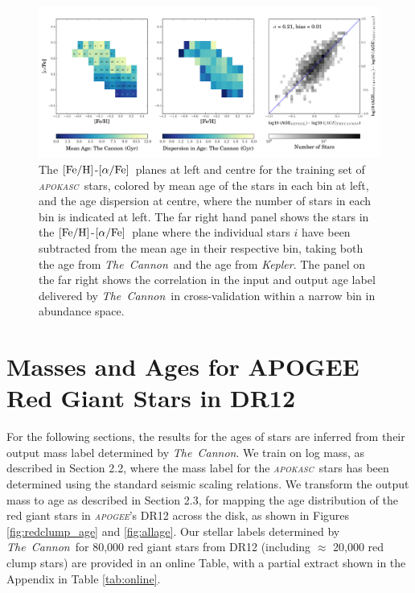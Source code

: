 \documentclass[12pt, preprint]{aastex}
\newcommand{\project}[1]{\textsl{#1}}
\newcommand{\tc}{\project{The~Cannon}}
\newcommand{\apogee}{\project{\textsc{apogee}}}
\newcommand{\apokasc}{\project{\textsc{apokasc}}}
\newcommand{\kepler}{\project{Kepler}}
\newcommand{\feh}{\mbox{$\rm [Fe/H]$}}
\newcommand{\alphafe}{\mbox{$\rm [\alpha/Fe]$}}
\begin{document}
\begin{figure}[p]
\centering
  \includegraphics[scale=0.4]{./plots/alpha_feh_rc2.pdf}
    \caption{The \feh-\alphafe\ planes at left and centre for the training set of \apokasc\ stars, colored by mean age of the stars in each bin at left,  and the age dispersion at centre, where the number of stars in each bin is indicated at left. The far right hand panel shows the stars in the \feh-\alphafe\ plane where the individual stars $i$ have been subtracted from the mean age in their respective bin, taking both the age from \tc\ and the age from \kepler. The panel on the far right shows the correlation in the input and output age label delivered by \tc\ in cross-validation within a narrow bin in abundance space.  }
\label{fig:alphabins}
\end{figure}

\section{Masses and Ages for APOGEE Red Giant Stars in DR12} 

For the following sections, the results for the ages of stars are inferred from their output mass label determined by \tc. We train on log mass, as described in Section 2.2, where the mass label for the \apokasc\ stars has been determined using the standard seismic scaling relations. We transform the output mass to age as described in Section 2.3, for mapping the age distribution of the red giant stars in \apogee's DR12 across the disk, as shown in Figures \ref{fig:redclump_age} and \ref{fig:allage}. Our stellar labels determined by \tc\ for 80,000 red giant stars from DR12  (including $\approx$ 20,000 red clump stars) are provided in an online Table, with a partial extract shown in the Appendix in Table \ref{tab:online}. 
\end{document}
